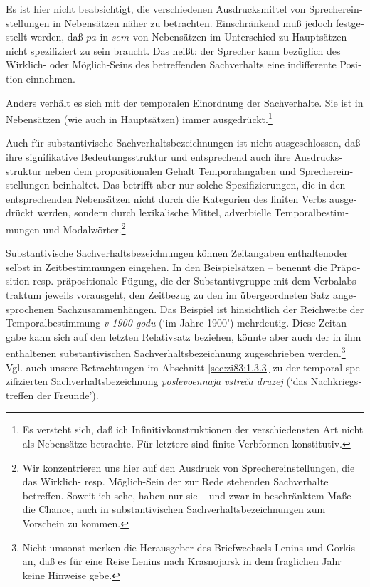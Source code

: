 \documentclass[output=paper]{langscibook}
\begin{document}
\begin{otherlanguage}{german}
Es ist hier nicht beabsichtigt, die verschiedenen Ausdrucksmittel von Spre\-cher\-ein\-stel\-lun\-gen in Nebensätzen näher zu betrachten. Einschränkend muß jedoch festgestellt werden, daß $pa$ in $sem$ von Nebensätzen im Unterschied zu Hauptsätzen nicht spezifiziert zu sein braucht. Das heißt: der Sprecher kann bezüglich des Wirklich- oder Möglich-Seins des betreffenden Sachverhalts eine indifferente Position einnehmen.

Anders verhält es sich mit der temporalen Einordnung der Sachverhalte. Sie ist in Nebensätzen (wie auch in Hauptsätzen) immer ausgedrückt.\footnote{Es versteht sich, daß ich Infinitivkonstruktionen der verschiedensten Art nicht als Nebensätze betrachte. Für letztere sind finite Verbformen konstitutiv.}

Auch für substantivische Sachverhaltsbezeichnungen ist nicht ausgeschlossen, daß ihre signifikative Bedeutungsstruktur und entsprechend auch ihre Ausdrucksstruktur neben dem propositionalen Gehalt Temporalangaben und Sprechereinstellungen beinhaltet. Das betrifft aber nur solche Spezifizierungen, die in den entsprechenden Nebensätzen nicht durch die Kategorien des finiten Verbs ausgedrückt werden, sondern durch lexikalische Mittel, adverbielle Temporalbestimmungen und Modalwörter.\footnote{Wir konzentrieren uns hier auf den Ausdruck von Sprechereinstellungen, die das Wirklich- resp. Möglich-Sein der zur Rede stehenden Sachverhalte betreffen. Soweit ich sehe, haben nur sie -- und zwar in beschränktem Maße -- die Chance, auch in substantivischen Sachverhaltsbezeichnungen zum Vorschein zu kommen.}

 Substantivische Sachverhaltsbezeichnungen können Zeitangaben enthalten\linebreak oder selbst in Zeitbestimmungen eingehen. In den Beispielsätzen -- benennt die Präposition resp. präpositionale Fügung, die der Substantivgruppe mit dem Verbalabstraktum jeweils vorausgeht, den Zeitbezug zu den im übergeordneten Satz angesprochenen Sachzusammenhängen. Das Beispiel  ist hinsichtlich der Reichweite der Temporalbestimmung \textit{v 1900 godu} (‘im Jahre 1900’) mehr\-deu\-tig. Diese Zeitangabe kann sich auf den letzten Relativsatz beziehen, könnte aber auch der in ihm enthaltenen substantivischen Sachverhaltsbezeichnung zu\-ge\-schrie\-ben werden.\footnote{Nicht umsonst merken die Herausgeber des Briefwechsels Lenins und Gorkis an, daß es für eine Reise Lenins nach Krasnojarsk in dem fraglichen Jahr keine Hinweise gebe.} Vgl. auch unsere Betrachtungen im Abschnitt \ref{sec:zi83:1.3.3} zu der temporal spezifizierten Sachverhaltsbezeichnung \textit{poslevoennaja vstreča druzej} (‘das Nachkriegstreffen der Freunde’).


\end{otherlanguage}
\end{document}
